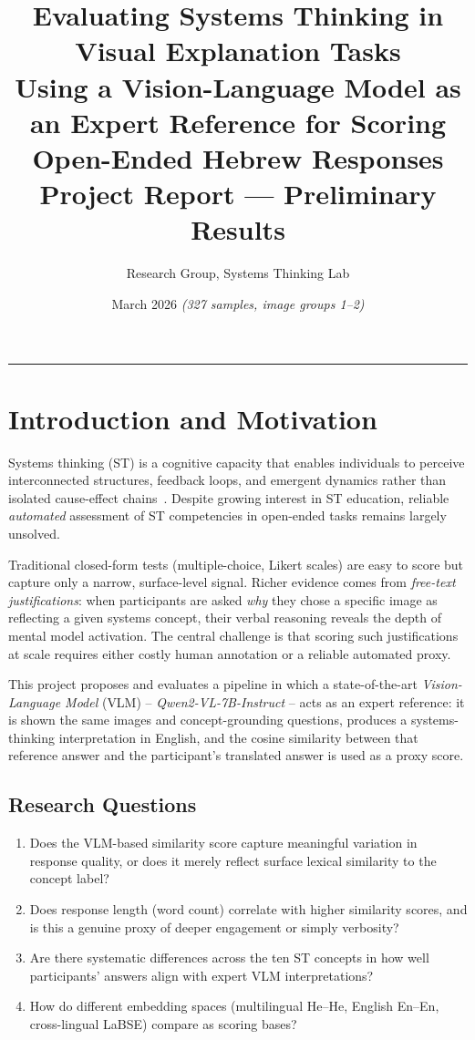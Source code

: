 \documentclass[12pt,a4paper]{article}
\title{%
  \textbf{Evaluating Systems Thinking in Visual Explanation Tasks}\\[0.4em]
  \large Using a Vision-Language Model as an Expert Reference for Scoring
  Open-Ended Hebrew Responses\\[0.6em]
  \normalsize Project Report --- Preliminary Results
}
\author{Research Group, Systems Thinking Lab}
\date{March 2026 \quad \small\textit{(327 samples, image groups 1--2)}}
\newcommand{\vlm}{\textsc{VLM}}
\newcommand{\Qwen}{\textit{Qwen2-VL-7B-Instruct}}
\begin{document}
\maketitle
\tableofcontents
\bigskip
\hrule
\bigskip

\section{Introduction and Motivation}

Systems thinking (ST) is a cognitive capacity that enables individuals to perceive
interconnected structures, feedback loops, and emergent dynamics rather than isolated
cause-effect chains~\citep{senge1990fifth}.  Despite growing interest in ST education,
reliable \emph{automated} assessment of ST competencies in open-ended tasks remains
largely unsolved.

Traditional closed-form tests (multiple-choice, Likert scales) are easy to score but
capture only a narrow, surface-level signal.  Richer evidence comes from \emph{free-text
justifications}: when participants are asked \emph{why} they chose a specific image as
reflecting a given systems concept, their verbal reasoning reveals the depth of mental
model activation.  The central challenge is that scoring such justifications at scale
requires either costly human annotation or a reliable automated proxy.

This project proposes and evaluates a pipeline in which a state-of-the-art
\emph{Vision-Language Model} (\vlm{}) -- \Qwen{} -- acts as an expert reference:
it is shown the same images and concept-grounding questions, produces a systems-thinking
interpretation in English, and the cosine similarity between that reference answer and
the participant's translated answer is used as a proxy score.

\subsection{Research Questions}

\begin{enumerate}[label=\textbf{RQ\arabic*.}]
  \item Does the \vlm{}-based similarity score capture meaningful variation in response
        quality, or does it merely reflect surface lexical similarity to the concept label?
  \item Does response length (word count) correlate with higher similarity scores, and
        is this a genuine proxy of deeper engagement or simply verbosity?
  \item Are there systematic differences across the ten ST concepts in how well
        participants' answers align with expert \vlm{} interpretations?
  \item How do different embedding spaces (multilingual He--He, English En--En,
        cross-lingual LaBSE) compare as scoring bases?
\end{enumerate}
\end{document}
